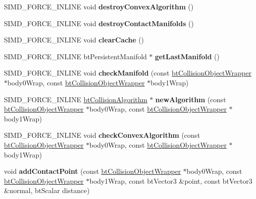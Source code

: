 \begin{DoxyCompactItemize}
\mbox{\label{classbtGImpactCollisionAlgorithm_a6fba8aeaadd20c3d882f20088fbeffdc}} 
S\+I\+M\+D\+\_\+\+F\+O\+R\+C\+E\+\_\+\+I\+N\+L\+I\+NE void {\bfseries destroy\+Convex\+Algorithm} ()
\item 
\mbox{\label{classbtGImpactCollisionAlgorithm_a5d5bc255d50740600f6b112b29450c3f}} 
S\+I\+M\+D\+\_\+\+F\+O\+R\+C\+E\+\_\+\+I\+N\+L\+I\+NE void {\bfseries destroy\+Contact\+Manifolds} ()
\item 
\mbox{\label{classbtGImpactCollisionAlgorithm_a915bad958b4e36822919ff4f0be0bea6}} 
S\+I\+M\+D\+\_\+\+F\+O\+R\+C\+E\+\_\+\+I\+N\+L\+I\+NE void {\bfseries clear\+Cache} ()
\item 
\mbox{\label{classbtGImpactCollisionAlgorithm_a3b50268a08d3ffe3f95f95f52997c57f}} 
S\+I\+M\+D\+\_\+\+F\+O\+R\+C\+E\+\_\+\+I\+N\+L\+I\+NE bt\+Persistent\+Manifold $\ast$ {\bfseries get\+Last\+Manifold} ()
\item 
\mbox{\label{classbtGImpactCollisionAlgorithm_afc77fd957d38e96422e9fea0f645ad16}} 
S\+I\+M\+D\+\_\+\+F\+O\+R\+C\+E\+\_\+\+I\+N\+L\+I\+NE void {\bfseries check\+Manifold} (const \hyperlink{structbtCollisionObjectWrapper}{bt\+Collision\+Object\+Wrapper} $\ast$body0\+Wrap, const \hyperlink{structbtCollisionObjectWrapper}{bt\+Collision\+Object\+Wrapper} $\ast$body1\+Wrap)
\item 
\mbox{\label{classbtGImpactCollisionAlgorithm_a9992300a3b680b51c546bdca268c26c4}} 
S\+I\+M\+D\+\_\+\+F\+O\+R\+C\+E\+\_\+\+I\+N\+L\+I\+NE \hyperlink{classbtCollisionAlgorithm}{bt\+Collision\+Algorithm} $\ast$ {\bfseries new\+Algorithm} (const \hyperlink{structbtCollisionObjectWrapper}{bt\+Collision\+Object\+Wrapper} $\ast$body0\+Wrap, const \hyperlink{structbtCollisionObjectWrapper}{bt\+Collision\+Object\+Wrapper} $\ast$body1\+Wrap)
\item 
\mbox{\label{classbtGImpactCollisionAlgorithm_af2e742d511464326eddcdf8266a34ab9}} 
S\+I\+M\+D\+\_\+\+F\+O\+R\+C\+E\+\_\+\+I\+N\+L\+I\+NE void {\bfseries check\+Convex\+Algorithm} (const \hyperlink{structbtCollisionObjectWrapper}{bt\+Collision\+Object\+Wrapper} $\ast$body0\+Wrap, const \hyperlink{structbtCollisionObjectWrapper}{bt\+Collision\+Object\+Wrapper} $\ast$body1\+Wrap)
\item 
\mbox{\label{classbtGImpactCollisionAlgorithm_ae8b6641aa8bacc59d362040e18a18fcc}} 
void {\bfseries add\+Contact\+Point} (const \hyperlink{structbtCollisionObjectWrapper}{bt\+Collision\+Object\+Wrapper} $\ast$body0\+Wrap, const \hyperlink{structbtCollisionObjectWrapper}{bt\+Collision\+Object\+Wrapper} $\ast$body1\+Wrap, const bt\+Vector3 \&point, const bt\+Vector3 \&normal, bt\+Scalar distance)
\end{DoxyCompactItemize}
